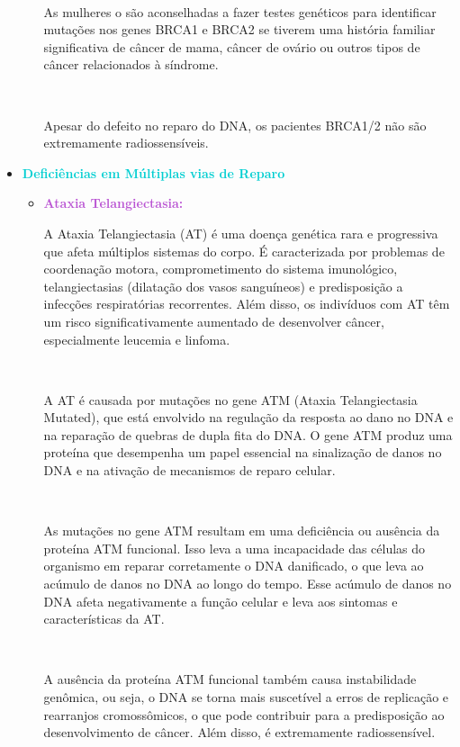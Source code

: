 \documentclass[11pt,a4paper]{article}
\begin{document}
\begin{itemize}[label=\textcolor{CarnationPink}{$\blacktriangleright$}]
\begin{itemize}[label=\textcolor{CarnationPink}{$\star$}]
			\

			As mulheres o são aconselhadas a fazer testes genéticos para identificar mutações nos genes BRCA1 e BRCA2 se tiverem uma história familiar significativa de câncer de mama, câncer de ovário ou outros tipos de câncer relacionados à síndrome.

			\

			Apesar do defeito no reparo do DNA, os pacientes BRCA1/2 não são extremamente radiossensíveis.

		\end{itemize}
		\item \textcolor{DarkTurquoise}{\LobsterTwo\Large\textbf{Deficiências em Múltiplas vias de Reparo}}
		\begin{itemize}[label=\textcolor{CarnationPink}{$\star$}]
			\item \textcolor{MediumOrchid}{\large\textbf{Ataxia Telangiectasia:}}
			
			A Ataxia Telangiectasia (AT) é uma doença genética rara e progressiva que afeta múltiplos sistemas do corpo. É caracterizada por problemas de coordenação motora, comprometimento do sistema imunológico, telangiectasias (dilatação dos vasos sanguíneos) e predisposição a infecções respiratórias recorrentes. Além disso, os indivíduos com AT têm um risco significativamente aumentado de desenvolver câncer, especialmente leucemia e linfoma.

			\

			A AT é causada por mutações no gene ATM (Ataxia Telangiectasia Mutated), que está envolvido na regulação da resposta ao dano no DNA e na reparação de quebras de dupla fita do DNA. O gene ATM produz uma proteína que desempenha um papel essencial na sinalização de danos no DNA e na ativação de mecanismos de reparo celular.

			\

			As mutações no gene ATM resultam em uma deficiência ou ausência da proteína ATM funcional. Isso leva a uma incapacidade das células do organismo em reparar corretamente o DNA danificado, o que leva ao acúmulo de danos no DNA ao longo do tempo. Esse acúmulo de danos no DNA afeta negativamente a função celular e leva aos sintomas e características da AT.

			\

			A ausência da proteína ATM funcional também causa instabilidade genômica, ou seja, o DNA se torna mais suscetível a erros de replicação e rearranjos cromossômicos, o que pode contribuir para a predisposição ao desenvolvimento de câncer. Além disso, é extremamente radiossensível.


\end{itemize}
\end{itemize}
\end{document}

